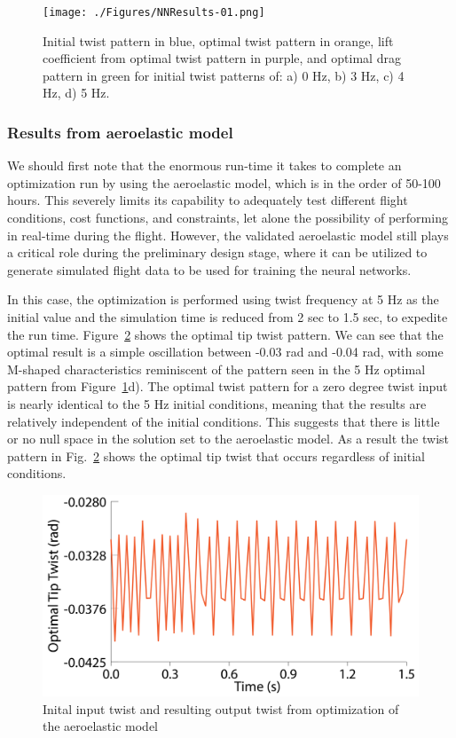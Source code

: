 \documentclass[11pt]{ucthesis}
\begin{document}
\begin{figure}[h!]
\centering
\texttt{[image: ./Figures/NNResults-01.png]}
\caption{Initial twist pattern in blue, optimal twist pattern in orange, lift coefficient from optimal twist pattern in purple, and optimal drag pattern in green for initial twist patterns of: a) 0 Hz, b) 3 Hz, c) 4 Hz, d) 5 Hz.}
\label{fig:NNResults}
\end{figure}

\subsubsection{Results from aeroelastic model}
We should first note that the enormous run-time it takes to complete an optimization run by using the aeroelastic model, which is in the order of 50-100 hours. This severely limits its capability to adequately test different flight conditions, cost functions, and constraints, let alone the possibility of performing in real-time during the flight. However, the validated aeroelastic model still plays a critical role during the preliminary design stage, where it can be utilized to generate simulated flight data to be used for training the neural networks.   

In this case, the optimization is performed using twist frequency at 5 Hz as the initial value and the simulation time is reduced from 2 sec to 1.5 sec, to expedite the run time. Figure~\ref{fig:AeroTwist} shows the optimal tip twist pattern. We can see that the optimal result is a simple oscillation between -0.03 rad and -0.04 rad, with some M-shaped characteristics reminiscent of the pattern seen in the 5 Hz optimal pattern from Figure~\ref{fig:NNResults}d). The optimal twist pattern for a zero degree twist input is nearly identical to the 5 Hz initial conditions, meaning that the results are relatively independent of the initial conditions. This suggests that there is little or no null space in the solution set to the aeroelastic model. As a result the twist pattern in Fig.~\ref{fig:AeroTwist} shows the optimal tip twist that occurs regardless of initial conditions.

\begin{figure}[h!]
\centering
\includegraphics[width=1\linewidth]{./Figures/AeroOptimalTwist-01.png}
\caption{Inital input twist and resulting output twist from optimization of the aeroelastic model}
\label{fig:AeroTwist}
\end{figure}
\end{document}
